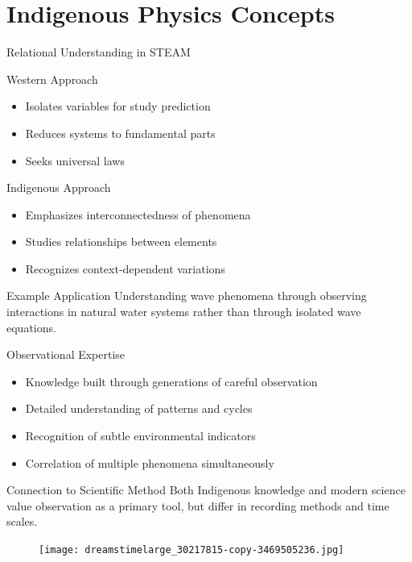 \documentclass{beamer}
\begin{document}
\section{Indigenous Physics Concepts}

\begin{frame}{Relational Understanding in STEAM}
    \begin{block}{Western Approach}
        \begin{itemize}
            \item Isolates variables for study prediction
            \item Reduces systems to fundamental parts
            \item Seeks universal laws
        \end{itemize}
    \end{block}
    
    \begin{block}{Indigenous Approach}
        \begin{itemize}
            \item Emphasizes interconnectedness of phenomena
            \item Studies relationships between elements
            \item Recognizes context-dependent variations
        \end{itemize}
    \end{block}
    
    \begin{exampleblock}{Example Application}
        Understanding wave phenomena through observing interactions in natural water systems rather than through isolated wave equations.
    \end{exampleblock}
\end{frame}

\begin{frame}{Observational Expertise}
    \begin{itemize}
        \item Knowledge built through generations of careful observation
        \item Detailed understanding of patterns and cycles
        \item Recognition of subtle environmental indicators
        \item Correlation of multiple phenomena simultaneously
    \end{itemize}
    
    \begin{alertblock}{Connection to Scientific Method}
        Both Indigenous knowledge and modern science value observation as a primary tool, but differ in recording methods and time scales.
    \end{alertblock}
    
   \begin{figure}
       \centering
       \texttt{[image: dreamstimelarge\_30217815-copy-3469505236.jpg]}
   \end{figure}
\end{frame}
\end{document}
